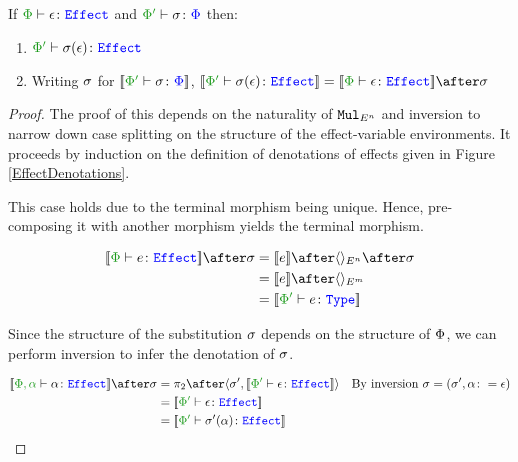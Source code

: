 \documentclass{Report}
\begin{document}
\begin{framed}
    \begin{theorem}\label{EffectSubstitutionOnEffects} 
        If $\wellformedeffect{\P}{\e}$ and $\typerelation{\P'}{\si}{\P}$ then: 
        \begin{enumerate}[label=\roman*.]
            \item $\wellformedeffect{\P'}{\si(\e)}$
            \item Writing $\si$ for $\deno{\typerelation{\P'}{\si}{\P}}$,  $\deno{\wellformedeffect{\P'}{\si(\e)}} = \deno{\wellformedeffect{\P}{\e}}\after\si$
        \end{enumerate}
          
    \end{theorem}
    
    \begin{proof}
        The proof of this depends on the naturality of $\Mul_{E^n}$ and inversion to narrow down case splitting on the structure of the effect-variable environments. It proceeds by induction on the definition of denotations of effects given in Figure \ref{EffectDenotations}.
    
        \case{\eground}
        This case holds due to the terminal morphism being unique. Hence, pre-composing it with another morphism yields the terminal morphism.
    
        \begin{align*}
            \deno{\typerelation{\P}{e}{\effect}}\after\si & = \deno{e}\after\term{E^n}\after\si \\
            & = \deno{e}\after\term{E^m} \\
            & = \deno{\typerelation{\P'}{e}{\type}}\\
        \end{align*}
    
    \case{\evar}
    
    Since the structure of the substitution $\si$ depends on the structure of $\P$, we can perform inversion to infer the denotation of $\si$.
    
    \begin{align*}
        \deno{\typerelation{\P,\a}{\a}{\effect}}\after\si &= \pp\after\pr{\si'}{\deno{\typerelation{\P'}{\e}{\effect}}}\qt{By inversion $\si = (\si', \a\setto\e)$}\\
        & =\deno{\typerelation{\P'}{\e}{\effect}} \\
        &= \deno{\typerelation{\P'}{\si'(\a)}{\effect}}\\
    \end{align*}
    

\end{proof}
\end{framed}
\end{document}
